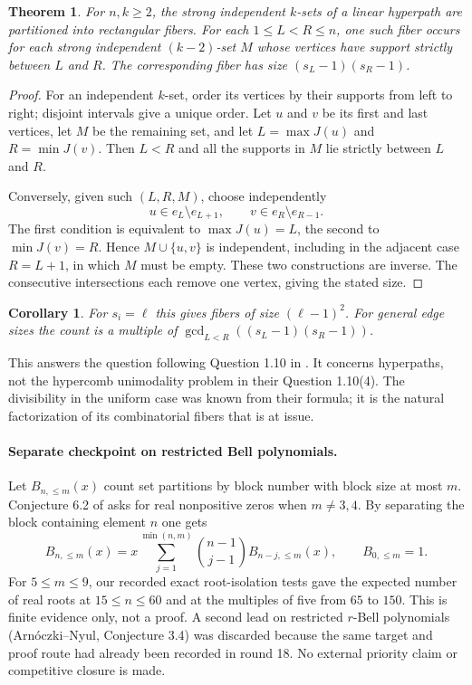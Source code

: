 \documentclass[11pt,a4paper]{article}
\newtheorem{SourceRceTtheorem}{Theorem}
\newtheorem{SourceRceTcorollary}{Corollary}
\begin{document}
\begin{SourceRceTtheorem}
For $n,k\ge2$, the strong independent $k$-sets of a linear hyperpath
are partitioned into rectangular fibers. For each $1\le L<R\le n$,
one such fiber occurs for each strong independent $(k-2)$-set $M$
whose vertices have support strictly between $L$ and $R$.
The corresponding fiber has size $(s_L-1)(s_R-1)$.
\end{SourceRceTtheorem}
\begin{proof}
For an independent $k$-set, order its vertices by their supports
from left to right; disjoint intervals give a unique order.
Let $u$ and $v$ be its first and last vertices, let $M$ be the remaining
set, and let $L=\max J(u)$ and $R=\min J(v)$. Then $L<R$ and all the
supports in $M$ lie strictly between $L$ and $R$.

Conversely, given such $(L,R,M)$, choose independently
\[
   u\in e_L\setminus e_{L+1},\qquad v\in e_R\setminus e_{R-1}.
\]
The first condition is equivalent to $\max J(u)=L$, the second to
$\min J(v)=R$. Hence $M\cup\{u,v\}$ is independent, including in
the adjacent case $R=L+1$, in which $M$ must be empty. These two
constructions are inverse. The consecutive intersections each remove
one vertex, giving the stated size.
\end{proof}
\begin{SourceRceTcorollary}
For $s_i=\ell$ this gives fibers of size $(\ell-1)^2$. For general
edge sizes the count is a multiple of
$\gcd_{L<R}((s_L-1)(s_R-1))$.
\end{SourceRceTcorollary}
This answers the question following Question 1.10 in \cite[p.~101]{R24T:gs}.
It concerns hyperpaths, not the hypercomb unimodality problem in their
Question 1.10(4). The divisibility in the uniform case was known from
their formula; it is the natural factorization of its combinatorial
fibers that is at issue.

\paragraph{Separate checkpoint on restricted Bell polynomials.}
Let $B_{n,\le m}(x)$ count set partitions by block number with block size
at most $m$. Conjecture 6.2 of \cite{R24T:mrv} asks for real nonpositive
zeros when $m\ne3,4$. By separating the block containing element $n$ one gets
\[
 B_{n,\le m}(x)=x\sum_{j=1}^{\min(n,m)}
       {n-1\choose j-1} B_{n-j,\le m}(x),\qquad B_{0,\le m}=1 .
\]
For $5\le m\le 9$, our recorded exact root-isolation tests gave the
expected number of real roots at $15\le n\le60$ and at the multiples
of five from $65$ to $150$. This is finite evidence only, not a
proof. A second lead on restricted $r$-Bell polynomials
(Arn\'oczki--Nyul, Conjecture 3.4) was discarded because the same
target and proof route had already been recorded in round 18.
No external priority claim or competitive closure is made.
\endgroup
\end{document}
